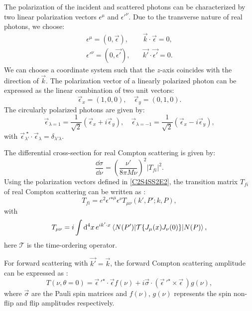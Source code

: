 The polarization of the incident and scattered photons can be characterized by two linear polarization vectors $\epsilon^\mu$ and $\epsilon'^\nu$. Due to the transverse nature of real photons, we choose:
\begin{equation} \label{C2S4SS2E2}
\begin{split}
\epsilon^\mu = (0,\vec{\epsilon}), & \quad \vec{k}\cdot\vec{\epsilon} = 0, \\
\epsilon'^\nu = (0,\vec{\epsilon'}), & \quad \vec{k'}\cdot\vec{\epsilon'} = 0.
\end{split}
\end{equation}
We can choose a coordinate system such that the $z$-axis coincides with the direction of $\vec{k}$. The polarization vector of a linearly polarized photon can be expressed as the linear combination of two unit vectors:
\begin{equation} \label{C2S4SS2E3}
\vec{\epsilon}_x = (1,0,0), \quad \vec{\epsilon}_y = (0,1,0).
\end{equation}
The circularly polarized photons are given by:
\begin{equation} \label{C2S4SS2E4}
\vec{\epsilon}_{\lambda=1} = \frac{1}{\sqrt{2}}(\vec{\epsilon}_x+i\vec{\epsilon}_y), \quad \vec{\epsilon}_{\lambda=-1} = \frac{1}{\sqrt{2}}(\vec{\epsilon}_x-i\vec{\epsilon}_y),
\end{equation}
with $\vec{\epsilon}^{\;\star}_{\lambda'}\cdot\vec{\epsilon}_{\lambda}=\delta_{\lambda'\lambda}$.

The differential cross-section for real Compton scattering is given by:
\begin{equation} \label{C2S4SS2E5}
\frac{\dd{\sigma}}{\dd{\nu}} = \left(\frac{\nu'}{8\pi M\nu}\right)^2|T_{fi}|^2.
\end{equation}
Using the polarization vectors defined in \cref{C2S4SS2E2}, the transition matrix $T_{fi}$ of real Compton scattering can be written as \cite{Thomas2001}:
\begin{equation} \label{C2S4SS2E6}
T_{fi} = e^2\epsilon'^{\star\mu}\epsilon^\nu T_{\mu\nu}(k',P';k,P),
\end{equation}
with
\begin{equation} \label{C2S4SS2E7}
T_{\mu\nu} = i\int\dd[4]{x}e^{ik'\cdot x}\mel{N(P')}{\mathcal{T}\{J_\mu(x)J_\nu(0)\}}{N(P)},
\end{equation}
here $\mathcal{T}$ is the time-ordering operator.

For forward scattering with $\vec{k'}=\vec{k}$, the forward Compton scattering amplitude can be expressed as \cite{Drechsel2003}:
\begin{equation} \label{C2S4SS2E8}
T(\nu,\theta=0) = \vec{\epsilon}\,'^\star\cdot\vec{\epsilon}f(\nu)+i\vec{\sigma}\cdot(\vec{\epsilon}\,'^\star\times\vec{\epsilon}\,)g(\nu),
\end{equation}
where $\vec{\sigma}$ are the Pauli spin matrices and $f(\nu)$, $g(\nu)$ represents the spin non-flip and flip amplitudes respectively.

